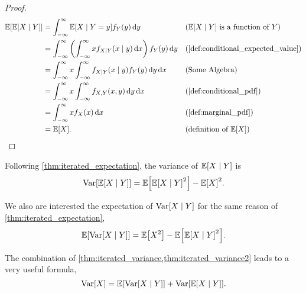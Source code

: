 \begin{proof}
    \begin{align*}
        \E{\E{X\mid Y}}
        &= \int_{-\infty}^{\infty}\E{X\mid Y=y}f_Y(y)\diff y && \text{($\E{X\mid Y}$ is a function of $Y$)}\\
        &= \int_{-\infty}^{\infty}\left(\int_{-\infty}^{\infty}xf_{X\mid Y}(x\mid y)\diff x\right)f_Y(y)\diff y && \text{(\cref{def:conditional_expected_value})}\\
        &= \int_{-\infty}^{\infty}x\int_{-\infty}^{\infty}f_{X\mid Y}(x\mid y)f_Y(y)\diff y\diff x && \text{(Some Algebra)}\\
        &= \int_{-\infty}^{\infty}x\int_{-\infty}^{\infty}f_{X,Y}(x,y)\diff y \diff x && \text{(\cref{def:conditional_pdf})}\\
        &= \int_{-\infty}^{\infty}xf_X(x)\diff x && \text{(\cref{def:marginal_pdf})}\\
        &= \E{X}. && \text{(definition of $\E{X}$)}
    \end{align*}
\end{proof}

\begin{theorem}
    \label{thm:iterated_variance}
    Following \cref{thm:iterated_expectation}, the variance of $\E{X\mid Y}$ is
    \[\Var[\E{X\mid Y}]= \E{\E{X\mid Y}^2}-\E{X}^2.\]
\end{theorem}

\begin{theorem}
    \label{thm:iterated_variance2}
    We also are interested the expectation of $\mathop{\mathrm{Var}}\nolimits[X\mid Y]$ for the same reason of \cref{thm:iterated_expectation},
    \[\E{\Var[X\mid Y]}=\E{X^2}-\E{\E{X\mid Y}^2}.\]
\end{theorem}

\begin{theorem}
    The combination of \cref{thm:iterated_variance,thm:iterated_variance2} leads to a very useful formula,
    \[\Var[X]=\E{\Var[X\mid Y]}+\Var[\E{X\mid Y}].\]
\end{theorem}